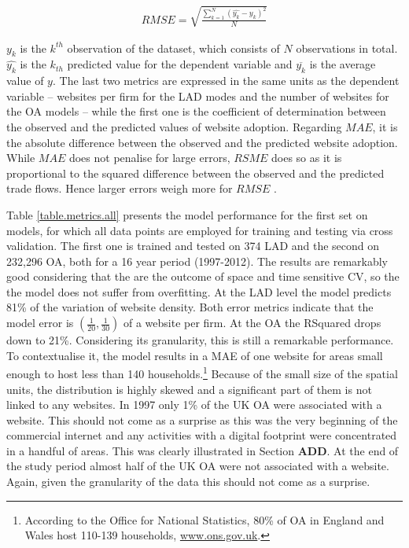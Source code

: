 \documentclass[
  authoryear,
  preprint,
  3p]{elsarticle}
\begin{document}
\begin{align}
RMSE =  \sqrt{\frac{\sum_{k = 1}^{N} (\hat{y_{k}} - y_{k})^2} {N}} \label{eq:rmse}
\end{align}

\(y_{k}\) is the \(k^{th}\) observation of the dataset, which consists
of \(N\) observations in total. \(\hat{y_{k}}\) is the \(k_{th}\)
predicted value for the dependent variable and \(\overline{y_{k}}\) is
the average value of \(y\). The last two metrics are expressed in the
same units as the dependent variable -- websites per firm for the LAD
modes and the number of websites for the OA models -- while the first
one is the coefficient of determination between the observed and the
predicted values of website adoption. Regarding \(MAE\), it is the
absolute difference between the observed and the predicted website
adoption. While \(MAE\) does not penalise for large errors, \(RSME\)
does so as it is proportional to the squared difference between the
observed and the predicted trade flows. Hence larger errors weigh more
for \(RMSE\) \citep{pontius2008components}.

Table \ref{table.metrics.all} presents the model performance for the
first set on models, for which all data points are employed for training
and testing via cross validation. The first one is trained and tested on
374 LAD and the second on 232,296 OA, both for a 16 year period
(1997-2012). The results are remarkably good considering that the are
the outcome of space and time sensitive CV, so the the model does not
suffer from overfitting. At the LAD level the model predicts 81\% of the
variation of website density. Both error metrics indicate that the model
error is \((\frac{1}{20}, \frac{1}{30})\) of a website per firm. At the
OA the RSquared drops down to 21\%. Considering its granularity, this is
still a remarkable performance. To contextualise it, the model results
in a MAE of one website for areas small enough to host less than 140
households.\footnote{According to the Office for National Statistics,
  80\% of OA in England and Wales host 110-139 households,
  \href{https://www.ons.gov.uk/census/2001censusandearlier/dataandproducts/outputgeography/outputareas}{www.ons.gov.uk}.}
Because of the small size of the spatial units, the distribution is
highly skewed and a significant part of them is not linked to any
websites. In 1997 only 1\% of the UK OA were associated with a website.
This should not come as a surprise as this was the very beginning of the
commercial internet and any activities with a digital footprint were
concentrated in a handful of areas. This was clearly illustrated in
Section \textbf{ADD}. At the end of the study period almost half of the
UK OA were not associated with a website. Again, given the granularity
of the data this should not come as a surprise.
\end{document}
